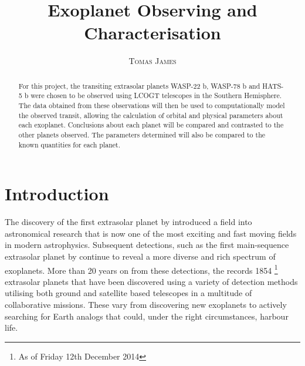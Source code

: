 \documentclass{report}
\title{\vspace{-15mm}\fontsize{24pt}{10pt}\selectfont\textbf{Exoplanet Observing and Characterisation}} %
\author{
\large
\textsc{Tomas James} %
\vspace{-5mm}
}
\date{}
\begin{document}
\maketitle %

\thispagestyle{fancy} %


\begin{abstract}
For this project, the transiting extrasolar planets WASP-22 b, WASP-78 b and HATS-5 b were chosen to be observed using LCOGT telescopes in the Southern Hemisphere. The data obtained from these observations will then be used to computationally model the observed transit, allowing the calculation of orbital and physical parameters about each exoplanet. Conclusions about each planet will be compared and contrasted to the other planets observed. The parameters determined will also be compared to the known quantities for each planet.
\end{abstract}


\tableofcontents %
\pagebreak %


\section{Introduction}
The discovery of the first extrasolar planet by \textcite{first} introduced a field into astronomical research that is now one of the most exciting and fast moving fields in modern astrophysics. Subsequent detections, such as the first main-sequence extrasolar planet by \textcite{MQ} continue to reveal a more diverse and rich spectrum of exoplanets. More than 20 years on from these detections, the \textcite{exo} records 1854 \footnote{As of Friday 12th December 2014} extrasolar planets that have been discovered using a variety of detection methods utilising both ground and satellite based telescopes in a multitude of collaborative missions. These vary from discovering new exoplanets to actively searching for Earth analogs that could, under the right circumstances, harbour life.
\end{document}
